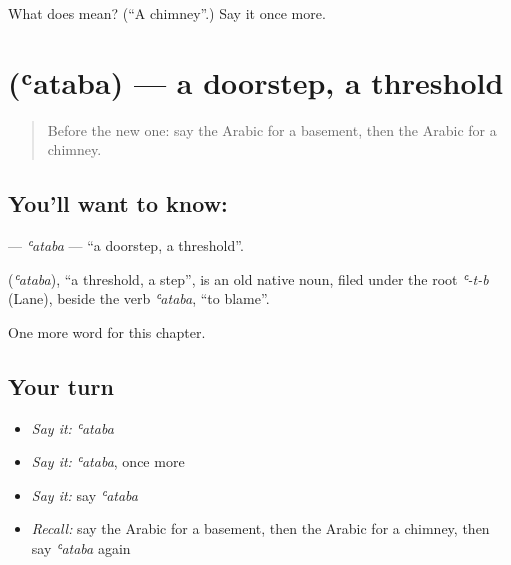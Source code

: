 \begin{tcolorbox}[breakable,colback=teal!4,colframe=teal!35!black,title={Before you move on}]
What does  mean? (\textquotedblleft{}A chimney\textquotedblright{}.) Say it once more.
\end{tcolorbox}
\section[\texorpdfstring{\ar{عتبة} (ʿataba)}{عتبة (ʿataba)}]{ (ʿataba) — a doorstep, a threshold}

\label{lesson:AR-C266-ataba}



\begin{quote}
Before the new one: say the Arabic for a basement, then the Arabic for a chimney.
\end{quote}

\subsection*{You'll want to know: }
\textbf{} — \emph{ʿataba} — \textquotedblleft{}a doorstep, a threshold\textquotedblright{}.

\begin{cousinweb}
\textbf{} (\emph{ʿataba}), \textquotedblleft{}a threshold, a step\textquotedblright{}, is an old native noun, filed under the root \emph{ʿ-t-b} (Lane), beside the verb \emph{ʿataba}, \textquotedblleft{}to blame\textquotedblright{}.
\end{cousinweb}

\begin{grammarlens}[title={What you've built}]
One more word for this chapter.
\end{grammarlens}

\subsection*{Your turn}
\begin{itemize}
\raggedright
  \item \emph{Say it:} \emph{ʿataba}
  \item \emph{Say it:} \emph{ʿataba}, once more
  \item \emph{Say it:} say \emph{ʿataba}
  \item \emph{Recall:} say the Arabic for a basement, then the Arabic for a chimney, then say \emph{ʿataba} again
\end{itemize}

